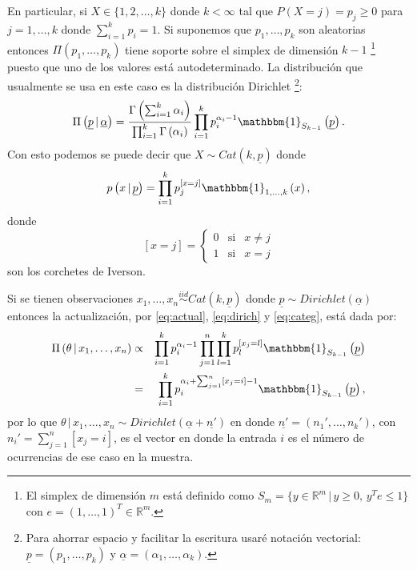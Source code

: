 \documentclass[runningheads,a4paper]{article}
\begin{document}
En particular, si $X \in \{1, 2, \ldots, k\}$ donde $k < \infty$ tal que %
$P\left( X = j \right) = p_{j} \geq 0$ para $j = 1, \ldots, k$ donde %
$\sum_{i = 1}^{k} p_{i} = 1$. Si suponemos que $p_{1}, \ldots, p_{k}$ son aleatorias entonces %
$\Pi\left( p_{1}, \ldots, p_{k} \right)$ tiene soporte sobre el simplex de dimensión $k-1$%
\footnote{El simplex de dimensión $m$ está definido como %
$S_{m} = \{y \in \mathbb{R}^{m} \,|\, y \geq 0,\, y^{T}e \leq 1\}$ %
con $e = (1, \ldots, 1)^{T} \in \mathbb{R}^{m}$.} %
puesto que uno de los valores está autodeterminado.
%
La distribución que usualmente se usa en este caso es la distribución Dirichlet%
\footnote{Para ahorrar espacio y facilitar la escritura usaré notación vectorial: %
$\underline{p} = \left( p_{1}, \ldots, p_{k}\right)$ y %
$\underline{\alpha} = \left( \alpha_{1}, \ldots, \alpha_{k}\right)$.}:
%
\begin{equation} \label{eq:dirich}
\Pi\left( \underline{p} \,|\, \underline{\alpha} \right) = %
\frac{\Gamma\left( \sum_{i = 1}^{k} \alpha_{i} \right)}%
{\prod_{i=1}^{k} \Gamma\left( \alpha_{i} \right)} %
\prod_{i=1}^{k} p_{i}^{\alpha_{i} - 1} %
\mathbbm{1}_{S_{k-1}}\left(\underline{p}\right).
\end{equation}
%
Con esto podemos se puede decir que $X \sim Cat\left(k, \underline{p} \right)$ donde
%
\begin{equation} \label{eq:categ}
p\left( x \,|\, \underline{p} \right) = \prod_{i = 1}^{k} p_{j}^{\left[x = j\right]} %
\mathbbm{1}_{1, \ldots, k}\left(x\right),
\end{equation}
%
donde 
%
\[
\left[ x = j \right] = \left\{ \begin{array}{lcl} %
0 & \text{si} & x \neq j \\
1 & \text{si} & x = j
\end{array}
\right.
\]
%
son los corchetes de Iverson.

Si se tienen observaciones $x_{1}, \ldots, x_{n} \stackrel{iid}{\sim} %
Cat\left( k, \underline{p} \right)$ donde $\underline{p} \sim %
Dirichlet\left( \underline{\alpha} \right)$ entonces la actualización, por %
\eqref{eq:actual}, \eqref{eq:dirich} y \eqref{eq:categ}, está dada por:
%
\begin{eqnarray*}
\Pi\left( \theta \,|\, x_{1}, \ldots, x_{n} \right) & \propto & %
\prod_{i = 1}^{k} p_{i}^{\alpha_{i} - 1} %
\prod_{j = 1}^{n} \prod_{l = 1}^{k} p_{l}^{\left[ x_{j} = l \right]} %
\mathbbm{1}_{S_{k-1}}\left( \underline{p} \right) \\
& = & \prod_{i = 1}^{k} p_{i}^{\alpha_{i} + %
\sum_{j = 1}^{n} \left[ x_{j} = i \right] - 1} %
\mathbbm{1}_{S_{k-1}}\left( \underline{p} \right),
\end{eqnarray*}
%
por lo que $\theta \,|\, x_{1}, \ldots, x_{n} \sim %
Dirichlet\left( \underline{\alpha} + \underline{n'} \right)$ en donde %
$\underline{n'} = \left(n_{1}', \ldots, n_{k}' \right)$, con %
$n_{i}' = \sum_{j = 1}^{n} \left[ x_{j} = i \right] $, es el vector en donde la entrada $i$ es el número de ocurrencias de ese caso en la muestra.
\end{document}
